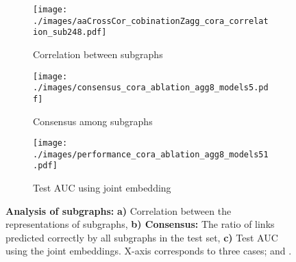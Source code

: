 \documentclass{article}
\begin{document}
\begin{table*}[tb]
\begin{center}
\begin{small}
\begin{sc}
{{\begin{tabular}{lllllllllllllll}
\end{tabular}}{}
}
\end{sc}
\end{small}
\end{center}
\vskip -0.1in
\end{table*}




\begin{figure}[t]
\vskip 0.2in
\begin{center}
     \begin{subfigure}[c]{0.32\columnwidth}
        \texttt{[image: ./images/aaCrossCor\_cobinationZagg\_cora\_correlation\_sub248.pdf]}
         \caption{Correlation between subgraphs}
     \end{subfigure}
     \begin{subfigure}[c]{0.32\columnwidth}
        \texttt{[image: ./images/consensus\_cora\_ablation\_agg8\_models5.pdf]}
         \caption{Consensus among subgraphs}
     \end{subfigure}
     \begin{subfigure}[c]{0.32\columnwidth}
        \texttt{[image: ./images/performance\_cora\_ablation\_agg8\_models51.pdf]}
         \caption{Test AUC using joint embedding}
     \end{subfigure}
\caption{\textbf{Analysis of subgraphs:} \textbf{a)} Correlation between the representations of subgraphs,  \textbf{b) Consensus:} The ratio of links predicted correctly by all subgraphs in the test set,  \textbf{c)} Test AUC using the joint embeddings. X-axis corresponds to three cases;  and .}\label{fig:analysis_subgraphs}
\end{center}
\vskip -0.2in
\end{figure}
\end{document}
